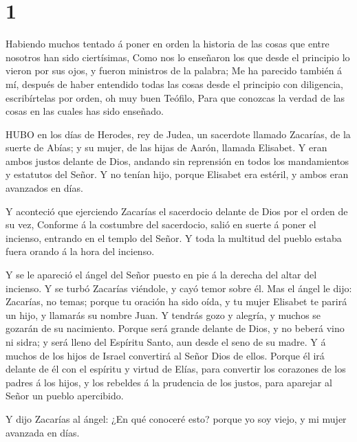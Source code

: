\hypertarget{section}{%
\section{1}\label{section}}

 Habiendo muchos tentado á poner en orden la historia de las
cosas que entre nosotros han sido ciertísimas,  Como nos lo
enseñaron los que desde el principio lo vieron por sus ojos, y fueron
ministros de la palabra;  Me ha parecido también á mí,
después de haber entendido todas las cosas desde el principio con
diligencia, escribírtelas por orden, oh muy buen Teófilo, 
Para que conozcas la verdad de las cosas en las cuales has sido
enseñado.

 HUBO en los días de Herodes, rey de Judea, un sacerdote
llamado Zacarías, de la suerte de Abías; y su mujer, de las hijas de
Aarón, llamada Elisabet.  Y eran ambos justos delante de
Dios, andando sin reprensión en todos los mandamientos y estatutos del
Señor.  Y no tenían hijo, porque Elisabet era estéril, y
ambos eran avanzados en días.

 Y aconteció que ejerciendo Zacarías el sacerdocio delante
de Dios por el orden de su vez,  Conforme á la costumbre del
sacerdocio, salió en suerte á poner el incienso, entrando en el templo
del Señor.  Y toda la multitud del pueblo estaba fuera
orando á la hora del incienso.

 Y se le apareció el ángel del Señor puesto en pie á la
derecha del altar del incienso.  Y se turbó Zacarías
viéndole, y cayó temor sobre él.  Mas el ángel le dijo:
Zacarías, no temas; porque tu oración ha sido oída, y tu mujer Elisabet
te parirá un hijo, y llamarás su nombre Juan.  Y tendrás
gozo y alegría, y muchos se gozarán de su nacimiento. 
Porque será grande delante de Dios, y no beberá vino ni sidra; y será
lleno del Espíritu Santo, aun desde el seno de su madre.  Y
á muchos de los hijos de Israel convertirá al Señor Dios de ellos.
 Porque él irá delante de él con el espíritu y virtud de
Elías, para convertir los corazones de los padres á los hijos, y los
rebeldes á la prudencia de los justos, para aparejar al Señor un pueblo
apercibido.

 Y dijo Zacarías al ángel: ¿En qué conoceré esto? porque yo
soy viejo, y mi mujer avanzada en días.

